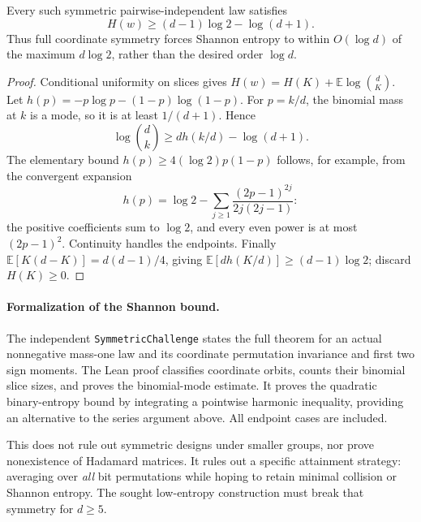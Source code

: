 \begin{theorem}
\label{s12:thm:symmetry-shannon}
Every such symmetric pairwise-independent law satisfies
\[
 H(w)\ge(d-1)\log2-\log(d+1).
\]
Thus full coordinate symmetry forces Shannon entropy to within
$O(\log d)$ of the maximum $d\log2$, rather than the desired
order $\log d$.
\end{theorem}
\begin{proof}
Conditional uniformity on slices gives
$H(w)=H(K)+\mathbb E\log\binom dK$.
Let $h(p)=-p\log p-(1-p)\log(1-p)$. For $p=k/d$, the binomial
mass at $k$ is a mode, so it is at least $1/(d+1)$. Hence
\[
 \log\binom dk\ge d h(k/d)-\log(d+1).
\]
The elementary bound $h(p)\ge4(\log2)p(1-p)$ follows, for example,
from the convergent expansion
\[
 h(p)=\log2-\sum_{j\ge1}
           \frac{(2p-1)^{2j}}{2j(2j-1)}:
\]
the positive coefficients sum to $\log2$, and every even power is
at most $(2p-1)^2$. Continuity handles the endpoints.
Finally $\mathbb E[K(d-K)]=d(d-1)/4$, giving
$\mathbb E[d h(K/d)]\ge(d-1)\log2$; discard $H(K)\ge0$.
\end{proof}

\paragraph{Formalization of the Shannon bound.}
The independent \texttt{SymmetricChallenge} states the full theorem for
an actual nonnegative mass-one law and its coordinate permutation
invariance and first two sign moments. The Lean proof classifies
coordinate orbits, counts their binomial slice sizes, and proves the
binomial-mode estimate. It proves the quadratic binary-entropy bound
by integrating a pointwise harmonic inequality, providing an alternative
to the series argument above. All endpoint cases are included.

This does not rule out symmetric designs under smaller groups, nor
prove nonexistence of Hadamard matrices. It rules out a specific
attainment strategy: averaging over \emph{all} bit permutations while
hoping to retain minimal collision or Shannon entropy. The sought
low-entropy construction must break that symmetry for $d\ge5$.


